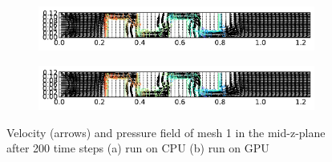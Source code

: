\documentclass[11pt]{article}
\begin{document}
\begin{appendices}
\begin{figure}[H]
\centering
\begin{subfigure}[b]{\textwidth}
   \includegraphics[width=1\linewidth]{fig1_t200_cpu.pdf}
   \caption{}
   \label{fig_cpu} 
\end{subfigure}

\begin{subfigure}[b]{\textwidth}
   \includegraphics[width=1\linewidth]{fig1_t200_gpu.pdf}
   \caption{}
   \label{fig_gpu}
\end{subfigure}
\caption{Velocity (arrows) and pressure field of mesh 1 in the mid-z-plane after 200 time steps (a) run on CPU (b) run on GPU}
\end{figure}


\end{appendices}
\end{document}

